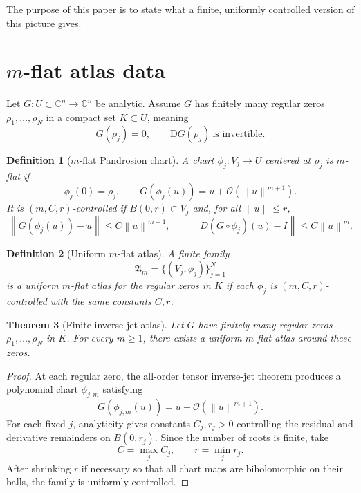 \documentclass[11pt]{article}
\newtheorem{definition}{Definition}[section]
\newtheorem{theorem}[definition]{Theorem}
\newcommand{\C}{\mathbb C}
\newcommand{\Oterm}{\mathcal O}
\newcommand{\D}{\mathrm D}
\newcommand{\A}{\mathfrak A}
\newcommand{\norm}[1]{\left\lVert #1\right\rVert}
\begin{document}
The purpose of this paper is to state what a finite, uniformly controlled version of this picture gives.

\section{\(m\)-flat atlas data}

Let \(G:U\subset\C^n\to\C^n\) be analytic. Assume \(G\) has finitely many regular zeros \(\rho_1,\ldots,\rho_N\) in a compact set \(K\subset U\), meaning
\[
        G(\rho_j)=0,\qquad \D G(\rho_j)\ \text{is invertible}.
\]

\begin{definition}[\(m\)-flat Pandrosion chart]
A chart \(\phi_j:V_j\to U\) centered at \(\rho_j\) is \(m\)-flat if
\[
        \phi_j(0)=\rho_j,\qquad
        G(\phi_j(u))=u+\Oterm(\norm{u}^{m+1}).
\]
It is \((m,C,r)\)-controlled if \(B(0,r)\subset V_j\) and, for all \(\norm{u}\le r\),
\[
        \norm{G(\phi_j(u))-u}\le C\norm{u}^{m+1},
        \qquad
        \norm{D(G\circ\phi_j)(u)-I}\le C\norm{u}^{m}.
\]
\end{definition}

\begin{definition}[Uniform \(m\)-flat atlas]
A finite family
\[
        \A_m=\{(V_j,\phi_j)\}_{j=1}^N
\]
is a uniform \(m\)-flat atlas for the regular zeros in \(K\) if each \(\phi_j\) is \((m,C,r)\)-controlled with the same constants \(C,r\).
\end{definition}

\begin{theorem}[Finite inverse-jet atlas]\label{thm:finite-atlas}
Let \(G\) have finitely many regular zeros \(\rho_1,\ldots,\rho_N\) in \(K\). For every \(m\ge1\), there exists a uniform \(m\)-flat atlas around these zeros.
\end{theorem}

\begin{proof}
At each regular zero, the all-order tensor inverse-jet theorem produces a polynomial chart \(\phi_{j,m}\) satisfying
\[
        G(\phi_{j,m}(u))=u+\Oterm(\norm{u}^{m+1}).
\]
For each fixed \(j\), analyticity gives constants \(C_j,r_j>0\) controlling the residual and derivative remainders on \(B(0,r_j)\). Since the number of roots is finite, take
\[
        C=\max_j C_j,\qquad r=\min_j r_j.
\]
After shrinking \(r\) if necessary so that all chart maps are biholomorphic on their balls, the family is uniformly controlled.
\end{proof}
\end{document}
